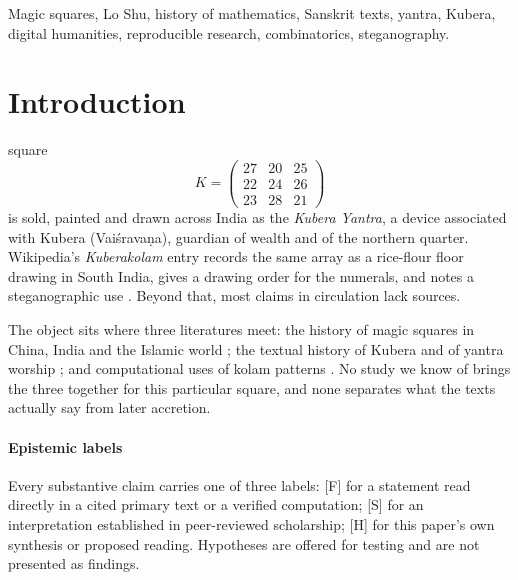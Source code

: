 \documentclass[journal]{IEEEtran}
\theoremstyle{definition}
\newcommand{\Fact}{\textsf{[F]}}
\newcommand{\Schol}{\textsf{[S]}}
\newcommand{\Hyp}{\textsf{[H]}}
\begin{document}
\begin{IEEEkeywords}
Magic squares, Lo Shu, history of mathematics, Sanskrit texts, yantra, Kubera, digital humanities, reproducible research, combinatorics, steganography.
\end{IEEEkeywords}

\section{Introduction}
 square
\begin{equation}
K=\begin{pmatrix}27&20&25\\22&24&26\\23&28&21\end{pmatrix}
\label{eq:K}
\end{equation}
is sold, painted and drawn across India as the \emph{Kubera Yantra}, a device associated with Kubera (Vai\'srava\d na), guardian of wealth and of the northern quarter. Wikipedia's \emph{Kuberakolam} entry records the same array as a rice-flour floor drawing in South India, gives a drawing order for the numerals, and notes a steganographic use \cite{wiki_kuberakolam}. Beyond that, most claims in circulation lack sources.

The object sits where three literatures meet: the history of magic squares in China, India and the Islamic world \cite{cammann1960,cammann1961,cammann1969a,cammann1969b,hayashi1987,datta1992,swetz2008}; the textual history of Kubera and of yantra worship \cite{sutherland1991,buhnemann2000}; and computational uses of kolam patterns \cite{amirtharajan2013}. No study we know of brings the three together for this particular square, and none separates what the texts actually say from later accretion.

\paragraph*{Epistemic labels} Every substantive claim carries one of three labels: \Fact{} for a statement read directly in a cited primary text or a verified computation; \Schol{} for an interpretation established in peer-reviewed scholarship; \Hyp{} for this paper's own synthesis or proposed reading. Hypotheses are offered for testing and are not presented as findings.
\end{document}
